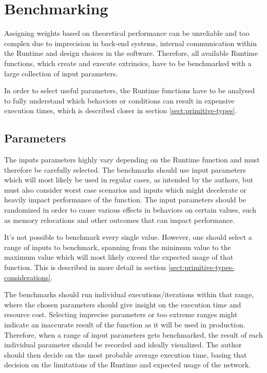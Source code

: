 \documentclass[11pt,a4paper]{article}
\begin{document}
\section{Benchmarking}\label{sect:benchmarking}
Assigning weights based on theoretical performance can be
unreliable and too complex due to imprecision in back-end systems, internal communication
within the Runtime and design choices in the software. Therefore, all available Runtime 
functions, which create and execute extrinsics, have to be benchmarked with a large
collection of input parameters.
\newline

In order to select useful parameters, the Runtime functions have to be analysed to fully
understand which behaviors or conditions can result in expensive execution times,
which is described closer in section \ref{sect:primitive-types}.

\subsection{Parameters}
The inputs parameters highly vary depending on the Runtime function and must therefore
be carefully selected. The benchmarks should use input parameters which will most likely be
used in regular cases, as intended by the authors, but must also consider worst case
scenarios and inputs which might decelerate or heavily impact performance of the function.
The input parameters should be randomized in order to cause various effects in behaviors
on certain values, such as memory relocations and other outcomes that can impact performance.
\newline

It's not possible to benchmark every single value. However, one should select a range
of inputs to benchmark, spanning from the minimum value
to the maximum value which will most likely exceed the expected usage of that function.
This is described in more detail in section \ref{sect:primitive-types-considerations}.
\newline

The benchmarks should run individual executions/iterations within that range, where the chosen parameters
should give insight on the execution time and resource cost. Selecting imprecise parameters
or too extreme ranges might indicate an inaccurate result of the function as it will be used in production.
Therefore, when a range of input parameters gets benchmarked, the result of each individual parameter
should be recorded and ideally visualized. The author should then decide on the most probable average
execution time, basing that decision on the limitations of the Runtime and expected usage of the network.
\newline
\end{document}
